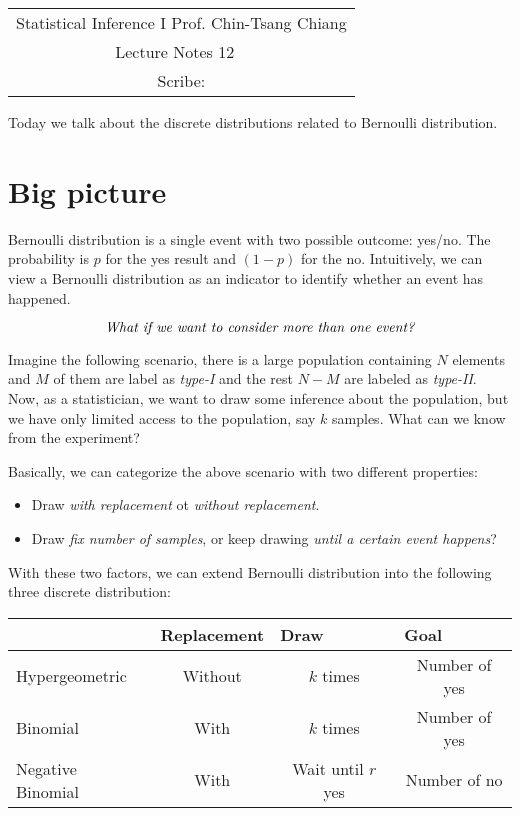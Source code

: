 \documentclass[../Distributions.tex]{subfiles}
\begin{document}
	\begin{center}
		\renewcommand{\arraystretch}{2}
		\begin{bfseries}
			\begin{tabular}{|c|}
				\hline
				Statistical Inference I \hfill Prof. Chin-Tsang Chiang\\
				\hspace{15em} {\large Lecture Notes 12} \hspace{15em}\ \\
				\lecdate \hfill Scribe: \scribe\\
				\hline
			\end{tabular}
			\renewcommand{\arraystretch}{1}
		\end{bfseries}
	\end{center}
Today we talk about the discrete distributions related to Bernoulli distribution.
\section{Big picture}
Bernoulli distribution is a single event with two possible outcome: yes/no. The probability is $p$ for the yes result and $(1-p)$ for the no. Intuitively, we can view a Bernoulli distribution as an indicator to identify whether an event has happened.

$$\mbox{\it What if we want to consider more than one event?}$$

Imagine the following scenario, there is a large population containing $N$ elements and $M$ of them are label as {\it type-I} and the rest $N-M$ are labeled as {\it type-II}. Now, as a statistician, we want to draw some inference about the population, but we have only limited access to the population, say $k$ samples. What can we know from the experiment?

Basically, we can categorize the above scenario with two different properties: 
\begin{itemize}
	\item Draw {\it with replacement} ot {\it without replacement}.
	\item Draw {\it fix number of samples}, or keep drawing {\it until a certain event happens}?
\end{itemize}

With these two factors, we can extend Bernoulli distribution into the following three discrete distribution:

\begin{table}[h]
	\centering
	\begin{tabular}{|l|c|c|c|}
		\hline
		& \multicolumn{1}{l|}{Replacement} & \multicolumn{1}{l|}{Draw} & \multicolumn{1}{l|}{Goal} \\ \hline
		Hypergeometric    & Without                          & $k$ times                 & Number of yes             \\ \hline
		Binomial          & With                             & $k$ times                 & Number of yes             \\ \hline
		Negative Binomial & With                             & Wait until $r$ yes        & Number of no              \\ \hline
	\end{tabular}
\end{table}
\end{document}
